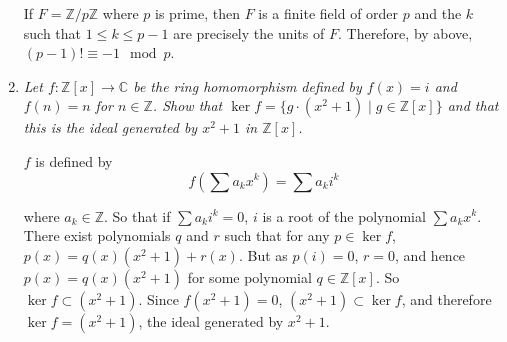 \documentclass[10pt]{article}
\newcommand{\Z}{\mathbb{Z}}
\newcommand{\C}{\mathbb{C}}
\begin{document}
\begin{enumerate}
If $F = \Z/p\Z$ where $p$ is prime, then $F$ is a finite field of order $p$ and the $k$ such that $1 \leq k \leq p-1$ are precisely the units of $F$.  Therefore, by above, $(p-1)! \equiv -1 \mod p$.

\item \emph{Let $f: \Z[x] \rightarrow \C$ be the ring homomorphism defined by $f(x) = i$ and $f(n) = n$ for $n \in \Z$.  Show that $\ker f = \{g \cdot (x^2+1) \mid g \in \Z[x]\}$ and that this is the ideal generated by $x^2+1$ in $\Z[x]$.}

$f$ is defined by
\[
f\left(\sum a_k x^k\right) = \sum a_k i^k
\]

where $a_k \in \Z$.  So that if $\sum a_k i^k = 0$, $i$ is a root of the polynomial $\sum a_k x^k$.  There exist polynomials $q$ and $r$ such that for any $p \in \ker f$, $p(x) = q(x)(x^2+1) + r(x)$.  But as $p(i) = 0$, $r = 0$, and hence $p(x) = q(x)(x^2+1)$ for some polynomial $q \in \Z[x]$.  So $\ker f \subset (x^2+1)$.  Since $f(x^2+1) = 0$, $(x^2+1) \subset \ker f$, and therefore $\ker f = (x^2+1)$, the ideal generated by $x^2+1$.

\end{enumerate}
\end{document}
